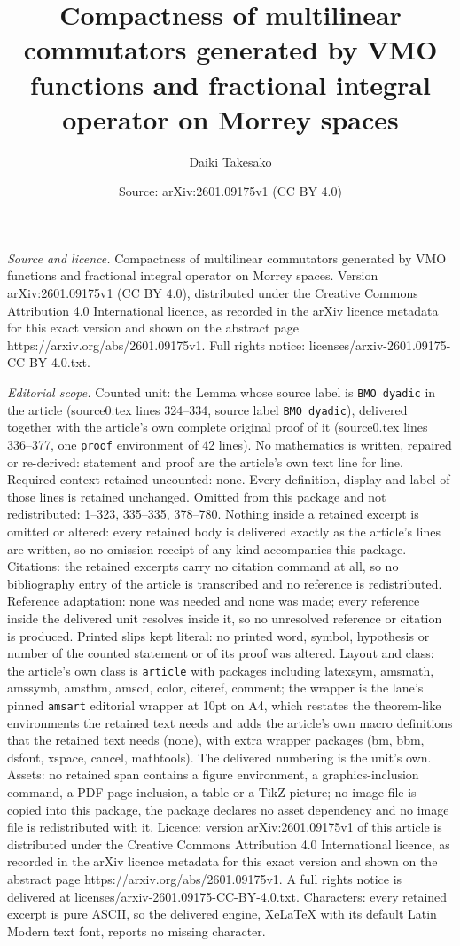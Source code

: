 \documentclass[10pt,a4paper]{amsart}
\title[Compactness of multilinear commutators generated by VMO func]{Compactness of multilinear commutators generated by VMO functions and fractional integral operator on Morrey spaces}
\author{Daiki Takesako}
\date{Source: arXiv:2601.09175v1 (CC BY 4.0)}
\begin{document}
\maketitle

\noindent\emph{Source and licence.} Compactness of multilinear commutators generated by VMO functions and fractional integral operator on Morrey spaces. Version arXiv:2601.09175v1 (CC BY 4.0), distributed under the Creative Commons Attribution 4.0 International licence, as recorded in the arXiv licence metadata for this exact version and shown on the abstract page https://arxiv.org/abs/2601.09175v1. Full rights notice: licenses/arxiv-2601.09175-CC-BY-4.0.txt.\par\smallskip

\noindent\textit{Editorial scope.} Counted unit: the Lemma whose source label is \texttt{BMO dyadic} in the article (source0.tex lines 324--334, source label \texttt{BMO dyadic}), delivered together with the article's own complete original proof of it (source0.tex lines 336--377, one \texttt{proof} environment of 42 lines). No mathematics is written, repaired or re-derived: statement and proof are the article's own text line for line. Required context retained uncounted: none. Every definition, display and label of those lines is retained unchanged. Omitted from this package and not redistributed: 1--323, 335--335, 378--780. Nothing inside a retained excerpt is omitted or altered: every retained body is delivered exactly as the article's lines are written, so no omission receipt of any kind accompanies this package. Citations: the retained excerpts carry no citation command at all, so no bibliography entry of the article is transcribed and no reference is redistributed. Reference adaptation: none was needed and none was made; every reference inside the delivered unit resolves inside it, so no unresolved reference or citation is produced. Printed slips kept literal: no printed word, symbol, hypothesis or number of the counted statement or of its proof was altered. Layout and class: the article's own class is \texttt{article} with packages including latexsym, amsmath, amssymb, amsthm, amscd, color, citeref, comment; the wrapper is the lane's pinned \texttt{amsart} editorial wrapper at 10pt on A4, which restates the theorem-like environments the retained text needs and adds the article's own macro definitions that the retained text needs (none), with extra wrapper packages (bm, bbm, dsfont, xspace, cancel, mathtools). The delivered numbering is the unit's own. Assets: no retained span contains a figure environment, a graphics-inclusion command, a PDF-page inclusion, a table or a TikZ picture; no image file is copied into this package, the package declares no asset dependency and no image file is redistributed with it. Licence: version arXiv:2601.09175v1 of this article is distributed under the Creative Commons Attribution 4.0 International licence, as recorded in the arXiv licence metadata for this exact version and shown on the abstract page https://arxiv.org/abs/2601.09175v1. A full rights notice is delivered at licenses/arxiv-2601.09175-CC-BY-4.0.txt. Characters: every retained excerpt is pure ASCII, so the delivered engine, XeLaTeX with its default Latin Modern text font, reports no missing character.
\end{document}
